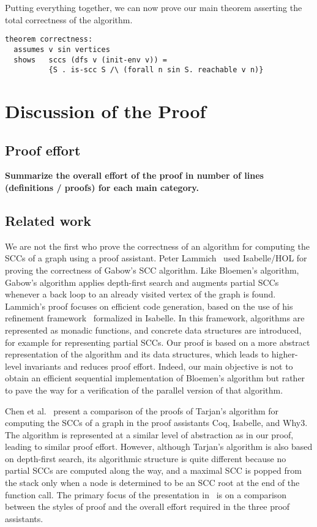 \documentclass[sigplan,10pt,anonymous,review]{acmart}
\begin{document}
Putting everything together, we can now prove our main theorem asserting the total correctness of the algorithm.

\begin{small}
\begin{lstlisting}[language=isabelle]
theorem correctness:
  assumes v sin vertices
  shows   sccs (dfs v (init-env v)) = 
          {S . is-scc S /\ (forall n sin S. reachable v n)}
\end{lstlisting}
\end{small}


\section{Discussion of the Proof}
\label{sec:discussion}

\subsection{Proof effort}
\label{sec:effort}

\textbf{Summarize the overall effort of the proof in number of lines (definitions / proofs) for each main category.}


\subsection{Related work}
\label{sec:related}

We are not the first who prove the correctness of an algorithm for computing the SCCs of a graph using a proof assistant. Peter Lammich~\cite{lammich:gabow} used Isabelle/HOL for proving the correctness of Gabow's SCC algorithm. Like Bloemen's algorithm, Gabow's algorithm applies depth-first search and augments partial SCCs whenever a back loop to an already visited vertex of the graph is found. Lammich's proof focuses on efficient code generation, based on the use of his refinement framework~\cite{lammich:refinement} formalized in Isabelle. In this framework, algorithms are represented as monadic functions, and concrete data structures are introduced, for example for representing partial SCCs. Our proof is based on a more abstract representation of the algorithm and its data structures, which leads to higher-level invariants and reduces proof effort. Indeed, our main objective is not to obtain an efficient sequential implementation of Bloemen's algorithm but rather to pave the way for a verification of the parallel version of that algorithm.

Chen et al.~\cite{chen:tarjan} present a comparison of the proofs of Tarjan's algorithm for computing the SCCs of a graph in the proof assistants Coq, Isabelle, and Why3. The algorithm is represented at a similar level of abstraction as in our proof, leading to similar proof effort. However, although Tarjan's algorithm is also based on depth-first search, its algorithmic structure is quite different because no partial SCCs are computed along the way, and a maximal SCC is popped from the stack only when a node is determined to be an SCC root at the end of the function call. The primary focus of the presentation in~\cite{chen:tarjan} is on a comparison between the styles of proof and the overall effort required in the three proof assistants.
\end{document}
